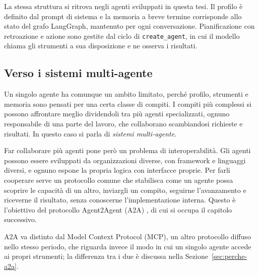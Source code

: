 La stessa struttura si ritrova negli agenti sviluppati in questa tesi. Il profilo è definito dal prompt di sistema e la memoria a breve termine corrisponde allo stato del grafo LangGraph, mantenuto per ogni conversazione. Pianificazione con retroazione e azione sono gestite dal ciclo di \texttt{create\_agent}, in cui il modello chiama gli strumenti a sua disposizione e ne osserva i risultati.

\subsection{Verso i sistemi multi-agente}

Un singolo agente ha comunque un ambito limitato, perché profilo, strumenti e memoria sono pensati per una certa classe di compiti. I compiti più complessi si possono affrontare meglio dividendoli tra più agenti specializzati, ognuno responsabile di una parte del lavoro, che collaborano scambiandosi richieste e risultati. In questo caso si parla di \emph{sistemi multi-agente}.

Far collaborare più agenti pone però un problema di interoperabilità. Gli agenti possono essere sviluppati da organizzazioni diverse, con framework e linguaggi diversi, e ognuno espone la propria logica con interfacce proprie. Per farli cooperare serve un protocollo comune che stabilisca come un agente possa scoprire le capacità di un altro, inviargli un compito, seguirne l'avanzamento e riceverne il risultato, senza conoscerne l'implementazione interna. Questo è l'obiettivo del protocollo Agent2Agent (A2A) \cite{a2aspec}, di cui si occupa il capitolo successivo.

A2A va distinto dal Model Context Protocol (MCP), un altro protocollo diffuso nello stesso periodo, che riguarda invece il modo in cui un singolo agente accede ai propri strumenti; la differenza tra i due è discussa nella Sezione~\ref{sec:perche-a2a}.
